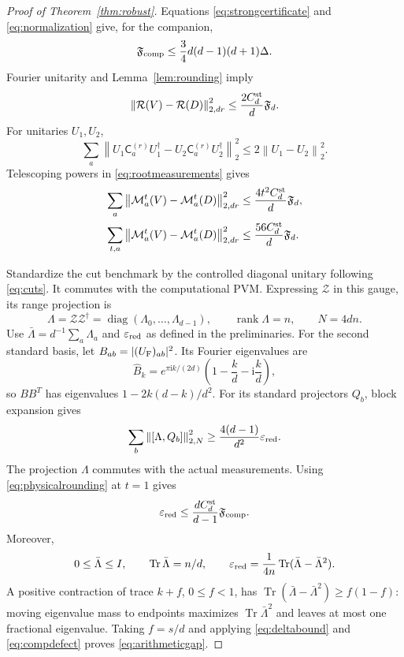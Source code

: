 \documentclass[11pt]{amsart}
\theoremstyle{remark}
\theoremstyle{plain}
\numberwithin{equation}{section}
\DeclareMathOperator{\Tr}{Tr}
\DeclareMathOperator{\rank}{rank}
\DeclareMathOperator{\diag}{diag}
\newcommand{\ii}{\mathrm i}
\newcommand{\norm}[1]{\left\|#1\right\|}
\newcommand{\Fdef}{\mathfrak F_d}
\newcommand{\Comp}[1]{\mathsf C^{(#1)}}
\newcommand{\RootP}{\mathcal M}
\newcommand{\epsred}{\varepsilon_{\rm red}}
\begin{document}
\begin{proof}[Proof of Theorem~\ref{thm:robust}]
Equations \eqref{eq:strongcertificate} and \eqref{eq:normalization}
give, for the companion,
\begin{equation}\label{eq:compdefect}
 \mathfrak F_{\rm comp}
 \le\frac34d(d-1)(d+1)\Delta.
\end{equation}
Fourier unitarity and Lemma~\ref{lem:rounding} imply
\[
 \norm{\mathcal R(V)-\mathcal R(D)}_{2,dr}^2
 \le\frac{2C_d^{\rm st}}d\Fdef.
\]
For unitaries \(U_1,U_2\),
\[
 \sum_a\norm{U_1\Comp r_aU_1^\dagger
             -U_2\Comp r_aU_2^\dagger}_2^2
 \le2\norm{U_1-U_2}_2^2.
\]
Telescoping powers in \eqref{eq:rootmeasurements} gives
\begin{equation}\label{eq:physicalrounding}
 \begin{split}
 \sum_a\norm{\RootP^t_a(V)-\RootP^t_a(D)}_{2,dr}^2
 &\le\frac{4t^2C_d^{\rm st}}d\Fdef,\\
 \sum_{t,a}\norm{\RootP^t_a(V)-\RootP^t_a(D)}_{2,dr}^2
 &\le\frac{56C_d^{\rm st}}d\Fdef.
 \end{split}
\end{equation}

Standardize the cut benchmark by the controlled diagonal unitary
following \eqref{eq:cuts}. It commutes with the computational PVM.
Expressing \(\mathcal Z\) in this gauge, its range projection is
\[
 \Lambda=\mathcal Z\mathcal Z^\dagger
 =\diag(\Lambda_0,\ldots,\Lambda_{d-1}),\qquad
 \rank\Lambda=n,\qquad N=4dn.
\]
Use \(\bar\Lambda=d^{-1}\sum_a\Lambda_a\) and \(\epsred\) as defined
in the preliminaries. For the second standard basis, let
\(B_{ab}=|(U_{\rm F})_{ab}|^2\). Its Fourier eigenvalues are
\[
 \widehat B_k=e^{\pi\ii k/(2d)}
 \left(1-\frac kd-\ii\frac kd\right),
\]
so \(BB^T\) has eigenvalues \(1-2k(d-k)/d^2\).
For its standard projectors \(Q_b\), block expansion gives
\[
 \sum_b\norm{[\Lambda,Q_b]}_{2,N}^2
 \ge\frac{4(d-1)}{d^2}\epsred.
\]
The projection \(\Lambda\) commutes with the actual measurements.
Using \eqref{eq:physicalrounding} at \(t=1\) gives
\begin{equation}\label{eq:deltabound}
 \epsred\le\frac{dC_d^{\rm st}}{d-1}\mathfrak F_{\rm comp}.
\end{equation}
Moreover,
\[
 0\le\bar\Lambda\le I,\qquad
 \Tr\bar\Lambda=n/d,\qquad
 \epsred=\frac1{4n}\Tr(\bar\Lambda-\bar\Lambda^2).
\]
A positive contraction of trace \(k+f\), \(0\le f<1\), has
\(\Tr(\bar\Lambda-\bar\Lambda^2)\ge f(1-f)\):
moving eigenvalue mass to endpoints maximizes
\(\Tr\bar\Lambda^2\) and leaves at most one fractional eigenvalue.
Taking \(f=s/d\) and applying \eqref{eq:deltabound} and
\eqref{eq:compdefect} proves \eqref{eq:arithmeticgap}.


\end{proof}
\end{document}
